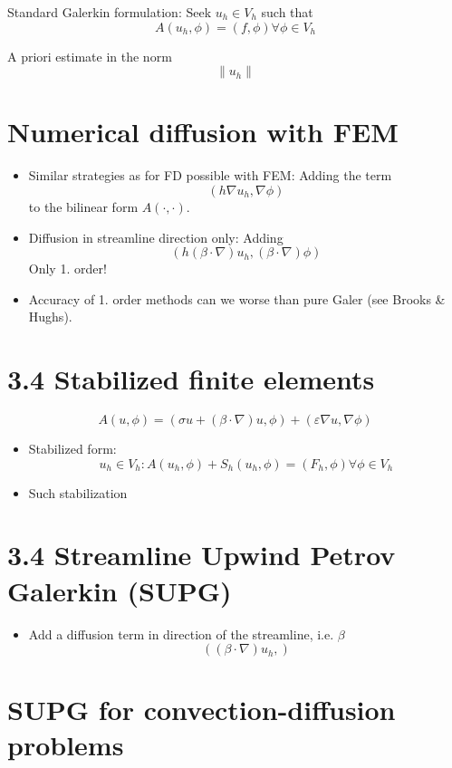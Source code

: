 \documentclass[openany,a4paper,11pt]{memoir}
\theoremstyle{definition}
\begin{document}
Standard Galerkin formulation: Seek $u_h\in V_h$ such that \[ A(u_h,\phi)=(f,\phi)\forall \phi\in V_h \]

A priori estimate in the norm \[\|u_h\| \]


\section{Numerical diffusion with FEM}

\begin{itemize}
\item Similar strategies as for FD possible with FEM: Adding the term \[ (h\nabla u_h,\nabla\phi) \]
  to the bilinear form $A(\cdot,\cdot)$.
  
\item Diffusion in streamline direction only: Adding \[ (h(\beta\cdot\nabla)u_h,(\beta\cdot\nabla)\phi)\] Only 1. order!

  
\item Accuracy of 1. order methods can we worse than pure Galer (see Brooks \& Hughs).
\end{itemize}

\section{3.4 Stabilized finite elements}

\[A(u,\phi)=(\sigma u + (\beta\cdot\nabla)u,\phi) + (\varepsilon\nabla u,\nabla \phi) \]
\begin{itemize}
\item Stabilized form: \[  u_h\in V_h: A(u_h,\phi) + S_h(u_h,\phi)=(F_h,\phi) \forall\phi\in V_h\]
  
\item Such stabilization
  
\end{itemize}

\section{3.4 Streamline Upwind Petrov Galerkin (SUPG)}

\begin{itemize}
\item Add a diffusion term in direction of the streamline, i.e. $\beta$ \[ ((\beta\cdot\nabla)u_h , ) \]
\end{itemize}

\section{SUPG for convection-diffusion problems}
\end{document}
